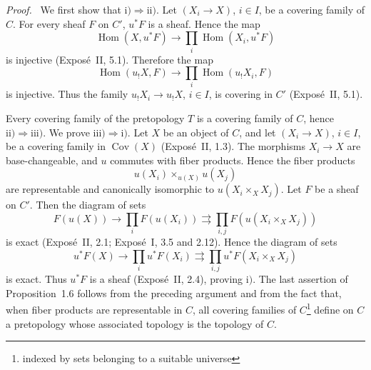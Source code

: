 \documentclass[11pt]{article}
\newcommand{\Hom}{\operatorname{Hom}}
\newcommand{\Cov}{\operatorname{Cov}}
\newenvironment{prooftext}{\par\noindent\emph{Proof.}\ }{\par\medskip}
\begin{document}
\begin{prooftext}
We first show that \(\mathrm{i)}\Rightarrow\mathrm{ii)}\). Let \((X_i\to X)\), \(i\in I\), be a covering family of \(C\). For every sheaf \(F\) on \(C'\), \(u^*F\) is a sheaf. Hence the map
\[
\Hom(X,u^*F)\longrightarrow\prod_i\Hom(X_i,u^*F)
\]
is injective (Expos\'e~II, 5.1). Therefore the map
\[
\Hom(u_!X,F)\longrightarrow\prod_i\Hom(u_!X_i,F)
\]
is injective. Thus the family \(u_!X_i\to u_!X\), \(i\in I\), is covering in \(C'\) (Expos\'e~II, 5.1).

Every covering family of the pretopology \(T\) is a covering family of \(C\), hence \(\mathrm{ii)}\Rightarrow\mathrm{iii)}\). We prove \(\mathrm{iii)}\Rightarrow\mathrm{i)}\). Let \(X\) be an object of \(C\), and let \((X_i\to X)\), \(i\in I\), be a covering family in \(\Cov(X)\) (Expos\'e~II, 1.3). The morphisms \(X_i\to X\) are base-changeable, and \(u\) commutes with fiber products. Hence the fiber products
\[
u(X_i)\times_{u(X)}u(X_j)
\]
are representable and canonically isomorphic to \(u(X_i\times_XX_j)\). Let \(F\) be a sheaf on \(C'\). Then the diagram of sets
\[
F(u(X))\longrightarrow\prod_iF(u(X_i))
\rightrightarrows\prod_{i,j}F(u(X_i\times_XX_j))
\]
is exact (Expos\'e~II, 2.1; Expos\'e~I, 3.5 and 2.12). Hence the diagram of sets
\[
u^*F(X)\longrightarrow\prod_i u^*F(X_i)
\rightrightarrows\prod_{i,j}u^*F(X_i\times_XX_j)
\]
is exact. Thus \(u^*F\) is a sheaf (Expos\'e~II, 2.4), proving \(\mathrm{i)}\). The last assertion of Proposition~1.6 follows from the preceding argument and from the fact that, when fiber products are representable in \(C\), all covering families of \(C\)\footnote{indexed by sets belonging to a suitable universe} define on \(C\) a pretopology whose associated topology is the topology of \(C\).
\end{prooftext}
\end{document}
